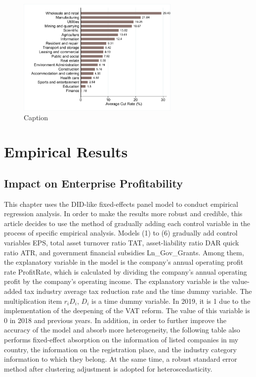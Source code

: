 \documentclass[3p,times]{elsarticle}
\begin{document}
\begin{figure}
    \centering
    \includegraphics[width=0.7\textwidth]{3.pdf}
    \caption{Caption}
    \label{fig:my_label}
\end{figure}

\section{Empirical Results}
\subsection{Impact on Enterprise Profitability}
This chapter uses the DID-like fixed-effects panel model to conduct empirical regression analysis. In order to make the results more robust and credible, this article decides to use the method of gradually adding each control variable in the process of specific empirical analysis. Models (1) to (6) gradually add control variables EPS, total asset turnover ratio TAT, asset-liability ratio DAR quick ratio ATR, and government financial subsidies Ln\_Gov\_Grants. Among them, the explanatory variable in the model is the company’s annual operating profit rate ProfitRate, which is calculated by dividing the company’s annual operating profit by the company’s operating income. The explanatory variable is the value-added tax industry average tax reduction rate and the time dummy variable. The multiplication item $r_i D_i$, $D_i$ is a time dummy variable. In 2019, it is 1 due to the implementation of the deepening of the VAT reform. The value of this variable is 0 in 2018 and previous years. In addition, in order to further improve the accuracy of the model and absorb more heterogeneity, the following table also performs fixed-effect absorption on the information of listed companies in my country, the information on the registration place, and the industry category information to which they belong. At the same time, a robust standard error method after clustering adjustment is adopted for heteroscedasticity.
\end{document}
